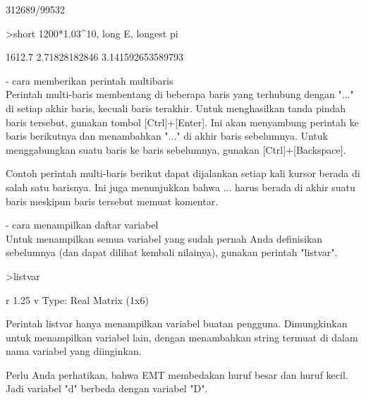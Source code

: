 \documentclass[a4paper,10pt]{article}
\begin{document}
\begin{eulernotebook}
\begin{eulercomment}
\begin{eulercomment}
\begin{euleroutput}
  312689/99532
\end{euleroutput}
\begin{eulerprompt}
>short 1200*1.03^10, long E, longest pi
\end{eulerprompt}
\begin{euleroutput}
  1612.7
  2.71828182846
        3.141592653589793 
\end{euleroutput}
\begin{eulercomment}
- cara memberikan perintah multibaris\\
Perintah multi-baris membentang di beberapa baris yang terhubung
dengan "..." di setiap akhir baris, kecuali baris terakhir. Untuk
menghasilkan tanda pindah baris tersebut, gunakan tombol
[Ctrl]+[Enter]. Ini akan menyambung perintah ke baris berikutnya dan
menambahkan "..." di akhir baris sebelumnya. Untuk menggabungkan suatu
baris ke baris sebelumnya, gunakan [Ctrl]+[Backspace].

Contoh perintah multi-baris berikut dapat dijalankan setiap kali
kursor berada di salah satu barisnya. Ini juga menunjukkan bahwa ...
harus berada di akhir suatu baris meskipun baris tersebut memuat
komentar.
\end{eulercomment}
\begin{eulercomment}
- cara menampilkan daftar variabel\\
Untuk menampilkan semua variabel yang sudah pernah Anda definisikan
sebelumnya (dan dapat dilihat kembali nilainya), gunakan perintah
"listvar".
\end{eulercomment}
\begin{eulerprompt}
>listvar
\end{eulerprompt}
\begin{euleroutput}
  r                   1.25
  v                   Type: Real Matrix (1x6)
\end{euleroutput}
\begin{eulercomment}
Perintah listvar hanya menampilkan variabel buatan pengguna.
Dimungkinkan untuk menampilkan variabel lain, dengan menambahkan
string  termuat di dalam nama variabel yang diinginkan.

Perlu Anda perhatikan, bahwa EMT membedakan huruf besar dan huruf
kecil. Jadi variabel "d" berbeda dengan variabel "D".


\end{eulercomment}
\end{eulercomment}
\end{eulercomment}
\end{eulernotebook}
\end{document}
